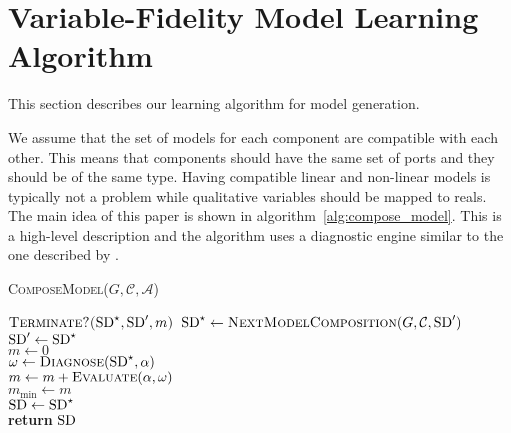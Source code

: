 \section{Variable-Fidelity Model Learning Algorithm}
%
This section describes our learning algorithm for model generation.

We assume that the set of models for
each component are compatible with each other. This means that
components should have the same set of ports and they should be of the
same type. Having compatible linear and non-linear models is typically
not a problem while qualitative variables should be mapped to
reals. The main idea of this paper is shown in
algorithm~\ref{alg:compose_model}. This is a high-level description
and the algorithm uses a diagnostic engine similar to the one
described by \cite{feldman13genius}.
%
\begin{algorithm}[htb]
\begin{footnotesize}
%
\caption{\textsc{ComposeModel}($G, \mathcal{C}, \mathcal{A}$)}
\label{alg:compose_model}
%
%
%
\vspace{0.075in}
%
\Repeat
{
$\textsc{Terminate?($\mathrm{SD}^\star, \mathrm{SD}^\prime, m$)}$
}
{
    $\mathrm{SD}^\star \gets \textsc{NextModelComposition}(G, \mathcal{C}, \mathrm{SD}^\prime)$\label{alg:next_model_composition}\\
    $\mathrm{SD}^\prime \gets \mathrm{SD}^\star$\\
    $m \gets 0$\\
    {
        $\omega \gets \textsc{Diagnose}(\mathrm{SD}^\star, \alpha)$\label{alg:diagnose}\\
        $m \gets m + \textsc{Evaluate}(\alpha, \omega)$\label{alg:evaluate}\\
    }
    {
        $m_{\min} \gets m$\\
        $\mathrm{SD} \gets \mathrm{SD}^\star$\label{alg:accept_end}\\
    }
}
\textbf{return} $\mathrm{SD}$
%
\end{footnotesize}
\end{algorithm}
%
\par

